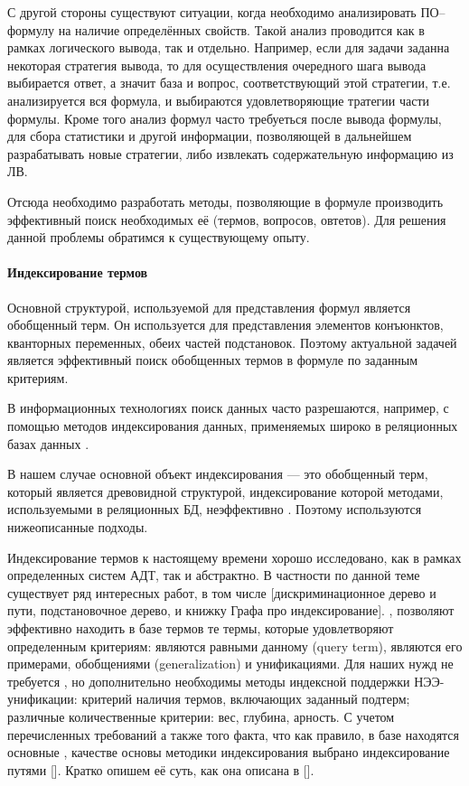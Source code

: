 С другой стороны существуют ситуации, когда необходимо анализировать ПО--формулу на наличие определённых свойств. Такой анализ проводится как в рамках логического вывода, так и отдельно. Например, если для задачи заданна некоторая стратегия вывода, то для осуществления очередного шага вывода выбирается ответ, а значит база и вопрос, соответствующий этой стратегии, т.е. анализируется вся формула, и выбираются удовлетворяющие тратегии части формулы. Кроме того анализ формул часто требуеться после вывода формулы, для сбора статистики и другой информации, позволяющей в дальнейшем разрабатывать новые стратегии, либо извлекать содержательную информацию из ЛВ.

Отсюда необходимо разработать методы, позволяющие в формуле производить эффективный поиск необходимых её (термов, вопросов, овтетов). Для решения данной проблемы обратимся к существующему опыту.    

\paragraph{Индексирование термов}
Основной структурой, используемой для представления формул является обобщенный терм. Он используется для представления элементов конъюнктов, кванторных переменных, обеих частей подстановок. Поэтому актуальной задачей является эффективный поиск обобщенных термов в формуле по заданным критериям.

В информационных технологиях поиск данных часто разрешаются, например, с помощью методов индексирования данных, применяемых широко в реляционных базах данных \cite{Ulman}. 

В нашем случае основной объект индексирования --- это обобщенный терм, который является древовидной структурой, индексирование которой методами, используемыми в  реляционных БД, неэффективно \cite{Graf}. Поэтому используются нижеописанные подходы.

Индексирование термов к настоящему времени хорошо исследовано, как в рамках определенных систем АДТ, так и абстрактно. В частности по данной теме существует ряд интересных работ, в том числе [дискриминационное дерево и пути, подстановочное дерево, и книжку Графа про индексирование]. , позволяют эффективно находить в базе термов те термы, которые удовлетворяют определенным критериям: являются равными данному (query term), являются его примерами, обобщениями (generalization) и унификациями. Для наших нужд не требуется , но дополнительно необходимы методы индексной поддержки НЭЭ-унификации: критерий наличия термов, включающих заданный подтерм; различные количественные критерии: вес, глубина, арность. С учетом перечисленных требований а также того факта, что как правило, в базе находятся основные , качестве основы методики индексирования выбрано индексирование путями []. Кратко опишем её суть, как она описана в [].

